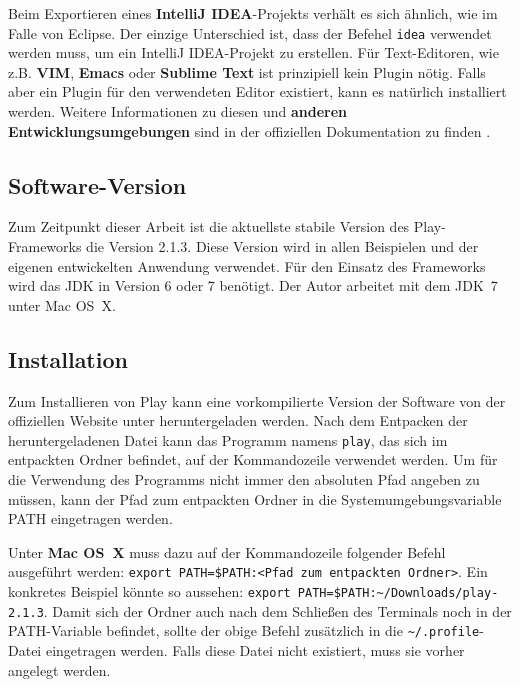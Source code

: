 Beim Exportieren eines \textbf{IntelliJ IDEA}-Projekts verhält es sich ähnlich, wie im Falle von Eclipse.
Der einzige Unterschied ist, dass der Befehel \lstinline|idea| verwendet werden muss, um ein IntelliJ IDEA-Projekt zu erstellen.
Für Text-Editoren, wie z.B. \textbf{VIM}, \textbf{Emacs} oder \textbf{Sublime Text} ist prinzipiell kein Plugin nötig.
Falls aber ein Plugin für den verwendeten Editor existiert, kann es natürlich installiert werden.
Weitere Informationen zu diesen und \textbf{anderen Entwicklungsumgebungen} sind in der offiziellen Dokumentation zu finden \cite[vgl.][]{ide}.



\subsection{Software-Version} %
\label{sub:software_version}

Zum Zeitpunkt dieser Arbeit ist die aktuellste stabile Version des Play-Frameworks die Version 2.1.3.
Diese Version wird in allen Beispielen und der eigenen entwickelten Anwendung verwendet.
Für den Einsatz des Frameworks wird das JDK in Version 6 oder 7 benötigt.
Der Autor arbeitet mit dem JDK~7 unter Mac OS~X.



\subsection{Installation} %
\label{sub:installation}

Zum Installieren von Play kann eine vorkompilierte Version der Software von der offiziellen Website unter \cite{play_download} heruntergeladen werden.
Nach dem Entpacken der heruntergeladenen Datei kann das Programm namens \lstinline|play|, das sich im entpackten Ordner befindet, auf der Kommandozeile verwendet werden.
Um für die Verwendung des Programms nicht immer den absoluten Pfad angeben zu müssen, kann der Pfad zum entpackten Ordner in die Systemumgebungsvariable PATH eingetragen werden.

Unter \textbf{Mac OS~X} muss dazu auf der Kommandozeile folgender Befehl ausgeführt werden: \lstinline|export PATH=$PATH:<Pfad zum entpackten Ordner>|.
Ein konkretes Beispiel könnte so aussehen: \lstinline|export PATH=$PATH:~/Downloads/play-2.1.3|.
Damit sich der Ordner auch nach dem Schließen des Terminals noch in der PATH-Variable befindet, sollte der obige Befehl zusätzlich in die \lstinline|~/.profile|-Datei eingetragen werden.
Falls diese Datei nicht existiert, muss sie vorher angelegt werden.


